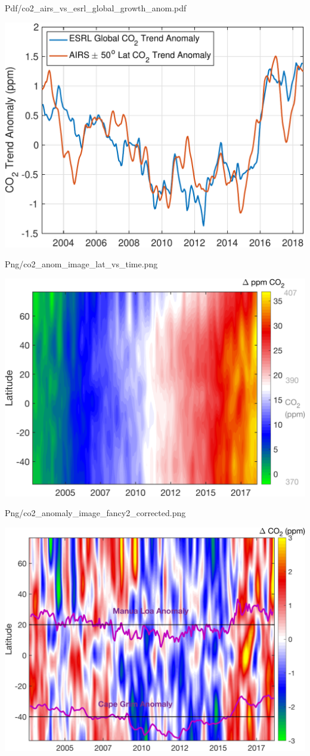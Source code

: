 \documentclass[10pt,t]{beamer}
\begin{document}
\begin{frame}[label={sec:orge350b67}]{Pdf/co2\_airs\_vs\_esrl\_global\_growth\_anom.pdf}
\begin{center}
\includegraphics[width=0.7\linewidth]{./Figs/Pdf/co2_airs_vs_esrl_global_growth_anom.pdf}
\end{center}
\end{frame}

\begin{frame}[label={sec:org3ab2171}]{Png/co2\_anom\_image\_lat\_vs\_time.png}
\begin{center}
\includegraphics[width=0.7\linewidth]{./Figs/Png/co2_anom_image_lat_vs_time.png}
\end{center}
\end{frame}

\begin{frame}[label={sec:orgc53cace}]{Png/co2\_anomaly\_image\_fancy2\_corrected.png}
\begin{center}
\includegraphics[width=0.7\linewidth]{./Figs/Png/co2_anomaly_image_fancy2_corrected.png}
\end{center}
\end{frame}
\end{document}

